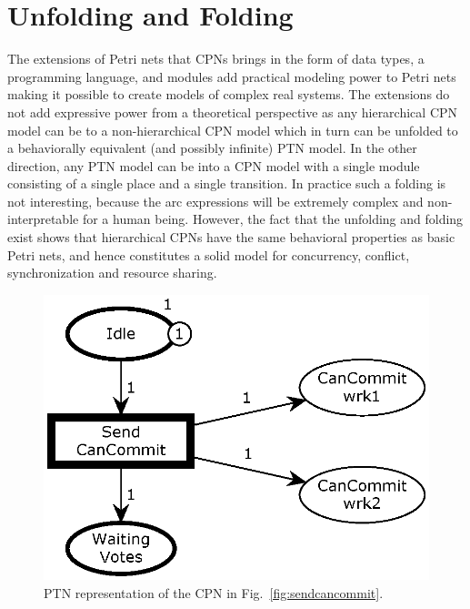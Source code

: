 \section{Unfolding and Folding}

The extensions of Petri nets that CPNs brings in the form of data
types, a programming language, and modules add practical modeling
power to Petri nets making it possible to create models of complex
real systems. The extensions do not add expressive power from a
theoretical perspective as any hierarchical CPN model can be
 to a non-hierarchical CPN model which in turn can
be unfolded to a behaviorally equivalent (and possibly infinite) PTN
model. In the other direction, any PTN model can be 
into a CPN model with a single module consisting of a single place and
a single transition. In practice such a folding is not interesting,
because the arc expressions will be extremely complex and
non-interpretable for a human being. However, the fact that the
unfolding and folding exist shows that hierarchical CPNs have the same
behavioral properties as basic Petri nets, and hence constitutes a
solid model for concurrency, conflict, synchronization and resource
sharing.




\begin{figure}[b]
\centering
\includegraphics[scale=.45]{figures/PTSendCanCommit.eps}
\caption{PTN representation of the CPN in Fig.~\ref{fig:sendcancommit}.}
\label{fig:sendcancommitunfold}
\end{figure}

